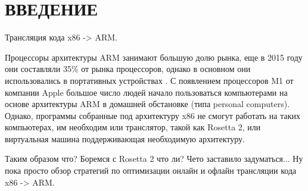 \section*{ВВЕДЕНИЕ}

Трансляция кода x86 -> ARM. 

Процессоры архитектуры ARM занимают большую долю рынка, еще в 2015 году они составляли 35\% от рынка процессоров, однако в основном они использовались в портативных устройствах \cite{arm_report}.  С появлением процессоров M1 от компании Apple большое число людей начало пользоваться компьютерами на основе архитектуры ARM в домашней обстановке (типа personal computers). Однако, программы собранные под архитектуру x86 не смогут работать на таких компьютерах, им необходим или транслятор, такой как Rosetta 2, или виртуальная машина поддерживающая необходимую архитектуру.

Таким образом что? Боремся с Rosetta 2 что ли? Чето заставило задуматься... Ну пока просто обзор стратегий по оптимизации онлайн и офлайн трансляции кода x86 -> ARM.
 
\pagebreak
